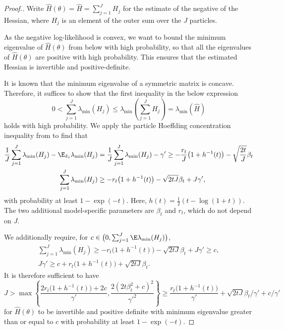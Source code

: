\begin{proof}[Proof.]
Write $\hat{H}(\theta) = \hat{H} = \sum_{j=1}^J H_j$ for the estimate of the negative of the Hessian, where $H_j$ is an element of the outer sum over the $J$ particles.

As the negative log-likelihood is convex, we want to bound the minimum eigenvalue of $\hat{H}(\theta)$ from below with high probability, so that all the eigenvalues of $\hat{H}(\theta)$ are positive with high probability. This ensures that the estimated Hessian is invertible and positive-definite.

It is known that the minimum eigenvalue of a symmetric matrix is concave. Therefore, it suffices to show that the first inequality in the below expression
\begin{equation}
    0 < \sum_{j=1}^J \lambda_{\min} (H_j) \leq  \lambda_{\min}\left(\sum_{j=1}^J H_j\right) = \lambda_{\min} (\hat{H})
\end{equation}
holds with high probability.
We apply the particle Hoeffding concentration inequality from \cite{delMoral11} to find that  
\begin{align}
    \frac{1}{J}\sum_{j=1}^J \lambda_{\min}(H_j) - \E_{\tilde{\pi}_t}\lambda_{\min}(H_j) &= \frac{1}{J}\sum_{j=1}^J \lambda_{\min}(H_j) - \gamma' \geq -\frac{r_t}{J}\big(1+h^{-1}(t)\big) - \sqrt{\frac{2t}{J}}\beta_t \\
    \sum_{j=1}^J \lambda_{\min}(H_j) &\geq -r_t\big(1+h^{-1}(t)\big) - \sqrt{2tJ}\beta_t + J\gamma',
\end{align}
with probability at least $1-\exp(-t)$. Here, $h(t) = \frac{1}{2}(t - \log(1+t))$. 
The two additional model-specific parameters are $\beta_t$ and $r_t$, which do not depend on $J$. 

We additionally require, for $c \in \big(0, \sum_{j=1}^J \E\lambda_{\min}(H_j)\big)$,
\begin{align}
    \sum_{j=1}^J \lambda_{\min}(H_j) \geq -r_t\big(1+h^{-1}(t)\big) - \sqrt{2tJ}\beta_t + J\gamma' \geq c, \\
    J\gamma' \geq c + r_t\big(1+h^{-1}(t)\big) + \sqrt{2tJ}\beta_t.
\end{align}
It is therefore sufficient to have
\begin{equation}
J > \max\left\{\frac{2r_t\big(1+h^{-1}(t)\big) + 2c}{\gamma'}, \frac{2(2t\beta_t^2+c)^2}{\gamma'^2}\right\} \geq  \frac{r_t\big(1+h^{-1}(t)\big)}{\gamma'} + \sqrt{2tJ}\beta_t/\gamma' + c/\gamma'    
\end{equation}
for $\hat{H}(\theta)$ to be invertible and positive definite with minimum eigenvalue greater than or equal to $c$ with probability at least $1-\exp(-t)$.

\end{proof}


